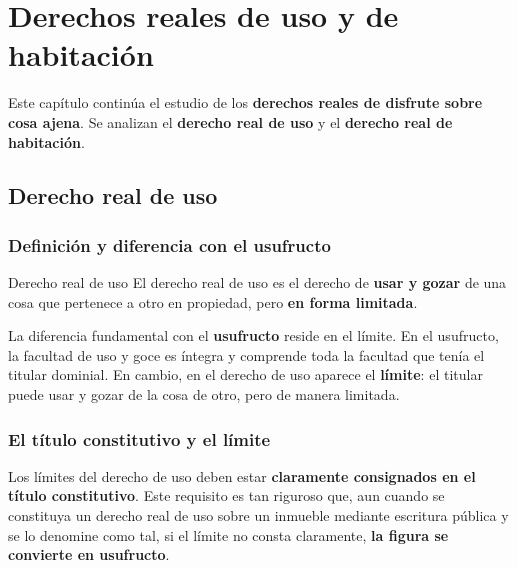 \documentclass[12pt,oneside]{book}
\begin{document}
\mainmatter


\chapter[Derechos reales de uso y de habitación]{Derechos reales de uso y de habitación}

Este capítulo continúa el estudio de los \textbf{derechos reales de disfrute sobre cosa ajena}. Se analizan el \textbf{derecho real de uso} y el \textbf{derecho real de habitación}.

\section{Derecho real de uso}

\subsection{Definición y diferencia con el usufructo}

\begin{definition}{Derecho real de uso}
El derecho real de uso es el derecho de \textbf{usar y gozar} de una cosa que pertenece a otro en propiedad, pero \textbf{en forma limitada}.
\end{definition}

La diferencia fundamental con el \textbf{usufructo} reside en el límite. En el usufructo, la facultad de uso y goce es íntegra y comprende toda la facultad que tenía el titular dominial. %
En cambio, en el derecho de uso aparece el \textbf{límite}: el titular puede usar y gozar de la cosa de otro, pero de manera limitada.

\subsection{El título constitutivo y el límite}

Los límites del derecho de uso deben estar \textbf{claramente consignados en el título constitutivo}. Este requisito es tan riguroso que, aun cuando se constituya un derecho real de uso sobre un inmueble mediante escritura pública y se lo denomine como tal, si el límite no consta claramente, \textbf{la figura se convierte en usufructo}.
\end{document}

